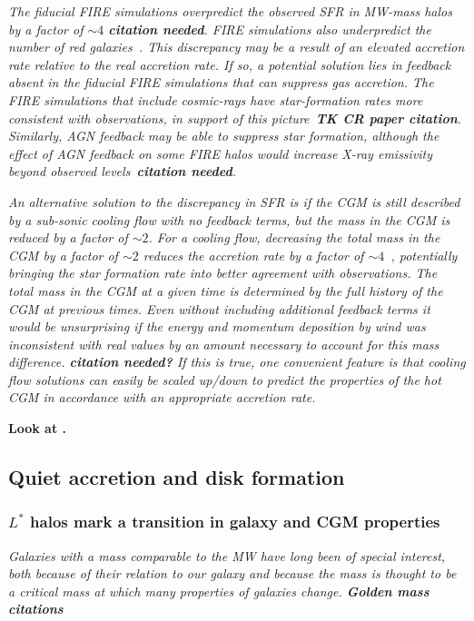 \documentclass[fleqn,usenatbib]{mnras}
\begin{document}
\textit{
The fiducial FIRE simulations overpredict the observed SFR in MW-mass halos by a factor of $\sim 4$ \textbf{citation needed}.
FIRE simulations also underpredict the number of red galaxies~\citep{Garrison-Kimmel2017}.
This discrepancy may be a result of an elevated accretion rate relative to the real accretion rate.
If so, a potential solution lies in feedback absent in the fiducial FIRE simulations that can suppress gas accretion.
The FIRE simulations that include cosmic-rays have star-formation rates more consistent with observations, in support of this picture~\textbf{TK CR paper citation}.
Similarly, AGN feedback may be able to suppress star formation, although the effect of AGN feedback on some FIRE halos would increase X-ray emissivity beyond observed levels~\textbf{citation needed}. 
}

\textit{
An alternative solution to the discrepancy in SFR is if the CGM is still described by a sub-sonic cooling flow with no feedback terms, but the mass in the CGM is reduced by a factor of  $\sim2$.
For a cooling flow, decreasing the total mass in the CGM by a factor of $\sim 2$ reduces the accretion rate by a factor of $\sim4$~\cite{Stern2019}, potentially bringing the star formation rate into better agreement with observations.
The total mass in the CGM at a given time is determined by the full history of the CGM at previous times.
Even without including additional feedback terms it would be unsurprising if the energy and momentum deposition by wind was inconsistent with real values by an amount necessary to account for this mass difference. \textbf{citation needed?}
If this is true, one convenient feature is that cooling flow solutions can easily be scaled up/down to predict the properties of the hot CGM in accordance with an appropriate accretion rate.
}

\textbf{Look at \cite{Dekel2014}.}

\subsection{Quiet accretion and disk formation}
\label{s: disk formation}

\subsubsection{$L^*$ halos mark a transition in galaxy and CGM properties}

\textit{
Galaxies with a mass comparable to the MW have long been of special interest, both because of their relation to our galaxy and because the mass is thought to be a critical mass at which many properties of galaxies change.
\textbf{Golden mass citations}
}
\end{document}
